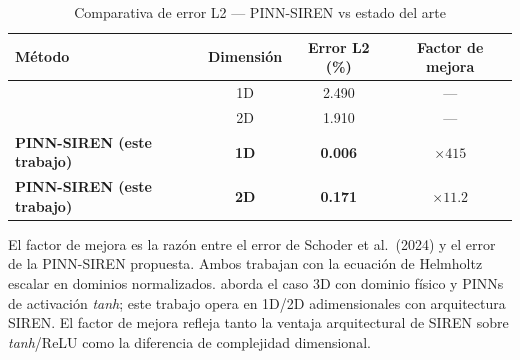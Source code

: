 \begin{table}[htbp]
\centering
\begin{threeparttable}
\caption{Comparativa de error L2 --- PINN-SIREN vs estado del arte}
\label{tab:comparativa}
\begin{tabular}{lccc}
\toprule
Método & Dimensión & Error L2 (\%) & Factor de mejora \\
\midrule
\citet{Schoder2024_PINN_acoustics} & 1D & 2.490 & ---        \\
\citet{Schoder2024_PINN_acoustics} & 2D & 1.910 & ---        \\
\textbf{PINN-SIREN (este trabajo)} & \textbf{1D} & \textbf{0.006} & $\times 415$ \\
\textbf{PINN-SIREN (este trabajo)} & \textbf{2D} & \textbf{0.171} & $\times 11.2$   \\
\bottomrule
\end{tabular}
\begin{tablenotes}
\small
\item El factor de mejora es la razón entre el error de Schoder et al.\ (2024)
      y el error de la PINN-SIREN propuesta.
      Ambos trabajan con la ecuación de Helmholtz escalar en dominios normalizados.
      \citet{Schoder2024_PINN_acoustics} aborda el caso 3D con dominio físico y PINNs
      de activación \textit{tanh}; este trabajo opera en 1D/2D adimensionales con
      arquitectura SIREN.
      El factor de mejora refleja tanto la ventaja arquitectural de SIREN sobre
      \textit{tanh}/ReLU como la diferencia de complejidad dimensional.
\end{tablenotes}
\end{threeparttable}
\end{table}
